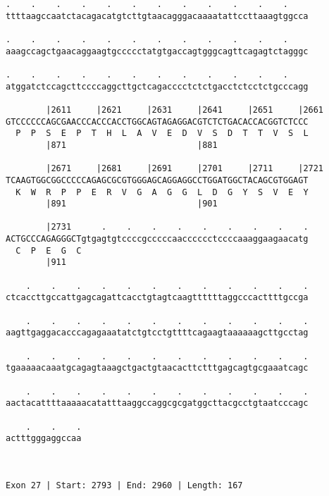 \documentclass{article}
\begin{document}
\begin{Verbatim}
.    .    .    .    .    .    .    .    .    .    .    .    
ttttaagccaatctacagacatgtcttgtaacagggacaaaatattccttaaagtggcca
                                                            
.    .    .    .    .    .    .    .    .    .    .    .    
aaagccagctgaacaggaagtgccccctatgtgaccagtgggcagttcagagtctagggc
                                                            
.    .    .    .    .    .    .    .    .    .    .    .    
atggatctccagcttccccaggcttgctcagacccctctctgacctctcctctgcccagg
                                                            
        |2611     |2621     |2631     |2641     |2651     |2661
GTCCCCCCAGCGAACCCACCCACCTGGCAGTAGAGGACGTCTCTGACACCACGGTCTCCC
  P  P  S  E  P  T  H  L  A  V  E  D  V  S  D  T  T  V  S  L
        |871                          |881                  
  
        |2671     |2681     |2691     |2701     |2711     |2721
TCAAGTGGCGGCCCCCAGAGCGCGTGGGAGCAGGAGGCCTGGATGGCTACAGCGTGGAGT
  K  W  R  P  P  E  R  V  G  A  G  G  L  D  G  Y  S  V  E  Y
        |891                          |901                  
  
        |2731      .    .    .    .    .    .    .    .    .
ACTGCCCAGAGGGCTgtgagtgtccccgcccccaacccccctccccaaaggaagaacatg
  C  P  E  G  C                                             
        |911                                                
  
    .    .    .    .    .    .    .    .    .    .    .    .
ctcaccttgccattgagcagattcacctgtagtcaagttttttaggcccacttttgccga
                                                            
    .    .    .    .    .    .    .    .    .    .    .    .
aagttgaggacacccagagaaatatctgtcctgttttcagaagtaaaaaagcttgcctag
                                                            
    .    .    .    .    .    .    .    .    .    .    .    .
tgaaaaacaaatgcagagtaaagctgactgtaacacttctttgagcagtgcgaaatcagc
                                                            
    .    .    .    .    .    .    .    .    .    .    .    .
aactacattttaaaaacatatttaaggccaggcgcgatggcttacgcctgtaatcccagc
                                                            
    .    .    .
actttgggaggccaa
               
               
 
Exon 27 | Start: 2793 | End: 2960 | Length: 167




\end{Verbatim}
\end{document}
